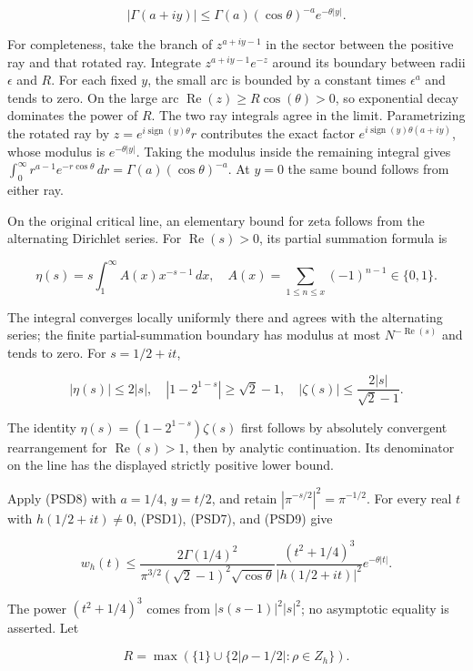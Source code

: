 \documentclass{article}
\begin{document}
\[
|\Gamma(a+iy)|
\le \Gamma(a)(\cos\theta)^{-a}e^{-\theta|y|}.
\tag{PSD8}
\]

For completeness, take the branch of \(z^{a+iy-1}\) in the sector between the positive ray and that rotated ray. Integrate \(z^{a+iy-1}e^{-z}\) around its boundary between radii \(\epsilon\) and \(R\). For each fixed \(y\), the small arc is bounded by a constant times \(\epsilon^a\) and tends to zero. On the large arc \(\operatorname{Re}(z)\ge R \cos(\theta)>0\), so exponential decay dominates the power of \(R\). The two ray integrals agree in the limit. Parametrizing the rotated ray by \(z=e^{i \operatorname{sign}(y) \theta}r\) contributes the exact factor \(e^{i \operatorname{sign}(y) \theta(a+iy)}\), whose modulus is \(e^{-\theta|y|}\). Taking the modulus inside the remaining integral gives \(\int_0^\infty r^{a-1}e^{-r\cos\theta}\,dr=\Gamma(a)(\cos\theta)^{-a}\). At \(y=0\) the same bound follows from either ray.

On the original critical line, an elementary bound for zeta follows from the alternating Dirichlet series. For \(\operatorname{Re}(s)>0\), its partial summation formula is

\[
\eta(s)=s\int_1^\infty A(x)x^{-s-1}\,dx,
\quad A(x)=\sum_{1\le n\le x}(-1)^{n-1}\in\{0,1\}.
\]

The integral converges locally uniformly there and agrees with the alternating series; the finite partial-summation boundary has modulus at most \(N^{-\operatorname{Re}(s)}\) and tends to zero. For \(s=1/2+it\),

\[
|\eta(s)|\le2|s|,
\quad |1-2^{1-s}|\ge\sqrt2-1,
\quad |\zeta(s)|\le\frac{2|s|}{\sqrt2-1}.
\tag{PSD9}
\]

The identity \(\eta(s)=(1-2^{1-s})\zeta(s)\) first follows by absolutely convergent rearrangement for \(\operatorname{Re}(s)>1\), then by analytic continuation. Its denominator on the line has the displayed strictly positive lower bound.

Apply (PSD8) with \(a=1/4\), \(y=t/2\), and retain \(|\pi^{-s/2}|^2=\pi^{-1/2}\). For every real \(t\) with \(h(1/2+it) \ne  0\), (PSD1), (PSD7), and (PSD9) give

\[
w_h(t)\le
\frac{2\Gamma(1/4)^2}
{\pi^{3/2}(\sqrt2-1)^2\sqrt{\cos\theta}}
\frac{(t^2+1/4)^3}{|h(1/2+it)|^2}
e^{-\theta|t|}.
\tag{PSD10}
\]

The power \((t^2+1/4)^3\) comes from \(|s(s-1)|^2|s|^2\); no asymptotic equality is asserted. Let

\[
R=\max\left(\{1\}\cup\{2|\rho-1/2|:\rho\in Z_h\}\right).
\]
\end{document}
